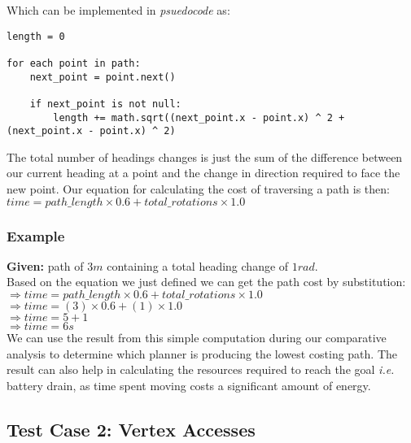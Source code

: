 \noindent
Which can be implemented in \textit{psuedocode} as: \\

\begin{lstlisting}
length = 0

for each point in path:
	next_point = point.next()
	
	if next_point is not null:
		length += math.sqrt((next_point.x - point.x) ^ 2 + (next_point.x - point.x) ^ 2)
\end{lstlisting}

\noindent
The total number of headings changes is just the sum of the difference between our current heading at a point and the change in direction required to face the new point. Our equation for calculating the cost of traversing a path is then: \\

\indent $time = path\_length \times 0.6 + total\_rotations \times 1.0$ \\

\newpage

\subsubsection{Example}

\noindent
\textbf{Given:} path of $3m$ containing a total heading change of $1rad$. \\

\noindent
Based on the equation we just defined we can get the path cost by substitution: \\

\indent $\Rightarrow time = path\_length \times 0.6 + total\_rotations \times 1.0$ \\
\indent $\Rightarrow time = (3) \times 0.6 + (1) \times 1.0$ \\
\indent $\Rightarrow time = 5 + 1$ \\
\indent $\Rightarrow time = 6s$ \\

\noindent
We can use the result from this simple computation during our comparative analysis to determine which planner is producing the lowest costing path. The result can also help in calculating the resources required to reach the goal \textit{i.e.} battery drain, as time spent moving costs a significant amount of energy.

\subsection{Test Case 2: Vertex Accesses}\label{test 2}

